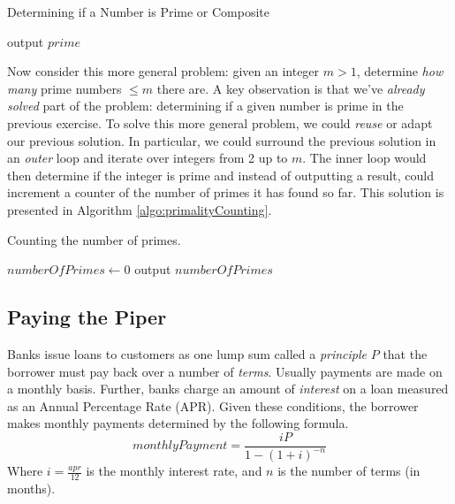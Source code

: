 \begin{algorithm}[h]
\caption{Determining if a Number is Prime or Composite}
\label{algo:primalityTesting}
output $prime$ \;
\end{algorithm}

Now consider this more general problem: given an integer $m > 1$, determine
\emph{how many} prime numbers $\leq m$ there are.  A key observation is that 
we've \emph{already solved} part of the problem: determining if a given number
is prime in the previous exercise.  To solve this more general problem, we could \emph{reuse}
or adapt our previous solution.  In particular, we could surround the previous
solution in an \emph{outer} loop and iterate over integers from 2 up to $m$.  
The inner loop would then determine if the integer is prime and instead of 
outputting a result, could increment a counter of the number of primes
it has found so far.
This solution is presented in Algorithm \ref{algo:primalityCounting}.

\begin{algorithm}[H]
\caption{Counting the number of primes.}
\label{algo:primalityCounting}
$numberOfPrimes \leftarrow 0$ \;
output $numberOfPrimes$ \;
\end{algorithm}

\subsection{Paying the Piper}
\label{subsection:loanAmortization}

Banks issue loans to customers as one lump sum called a \emph{principle} $P$ that
the borrower must pay back over a number of \emph{terms}.  Usually payments
are made on a monthly basis.  Further, banks charge an amount of \emph{interest} on a
loan measured as an Annual Percentage Rate (APR).  Given these conditions, 
the borrower makes monthly payments determined by the following formula.
$$ {monthlyPayment} = \frac{iP}{1 - (1 + i)^{-n}} $$
Where $i = \frac{apr}{12}$ is the monthly interest rate, and $n$ is the number of terms
(in months).


